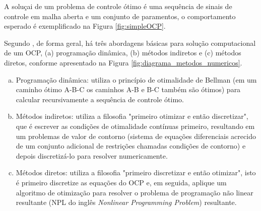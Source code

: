 A soluçai de um problema de controle ótimo é uma sequência de sinais de controle em malha aberta e um conjunto de paramentos, o comportamento esperado é
exemplificado na Figura \ref{fig:simpleOCP}.

Segundo \citeauthor{article:Diehl}, de forma geral, há três abordagens básicas para solução computacional de um OCP, (a) programação dinâmica, (b) métodos indiretos e (c) métodos diretos, 
conforme apresentado na Figura \ref{fig:diagrama_metodos_numericos}.

\begin{enumerate}[(a)]
	\item Programação dinâmica: utiliza o princípio de otimalidade de Bellman (em um caminho ótimo A-B-C os caminhos A-B e B-C também são ótimos) para calcular recursivamente a sequência de controle ótimo. 
	\item Métodos indiretos: utiliza a filosofia "primeiro otimizar e então discretizar", que é escrever as condições de otimalidade contínuas primeiro,
		resultando em um problemas de valor de contorno (sistema de equações diferenciais acrecido de um conjunto adicional de restrições chamadas condições de contorno) e depois discretizá-lo para resolver numericamente.
	\item Métodos diretos: utiliza a filosofia "primeiro discretizar e então otimizar", isto é primeiro discretize as equações do OCP e, em seguida, aplique um algoritmo de otimização para resolver o problema de programação 
	não linear resultante (NPL do inglês \textit{Nonlinear Programming Problem}) resultante.
\end{enumerate}

